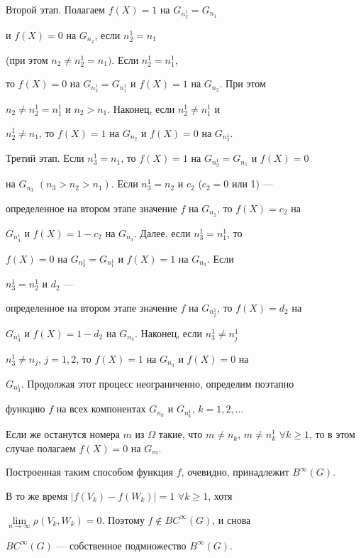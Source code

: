 \begin{pf}
Второй этап. Полагаем $f(X)=1$ на $G_{n^1_2}=G_{n_1}$


и $f(X)=0$ на $G_{n_2}$, если $n_2^1=n_1$


(при этом $n_2\neq n_2^1=n_1)$. Если $n_2^1=n_1^1$,


то $f(X)=0$ на $G_{n^1_2}=G_{n^1_1}$ и $f(X)=1$ на $G_{n_2}$. При этом


$n_2\neq n_2^1=n_1^1$ и $n_2>n_1$. Наконец, если $n_2^1\neq n_1^1$ и


$n_2^1\neq n_1$, то $f(X)=1$ на $G_{n_2}$ и $f(X)=0$ на $G_{n^1_2}$.


Третий этап. Если $n_3^1=n_1$, то $f(X)=1$ на $G_{n^1_3}=G_{n_1}$ и $f(X)=0$


на $G_{n_3}$ $(n_3>n_2>n_1)$. Если $n_3^1=n_2$ и $c_2$ ($c_2=0$ или 1) ---


определенное на втором этапе значение $f$ на $G_{n_2}$, то $f(X)=c_2$ на


$G_{n^1_3}$ и $f(X)=1-c_2$ на $G_{n_3}$. Далее, если $n_3^1=n_1^1$, то


$f(X)=0$ на $G_{n^1_3}=G_{n^1_1}$ и $f(X)=1$ на $G_{n_3}$. Если


$n_3^1=n_2^1$ и $d_2$ ---


определенное на втором этапе значение $f$ на $G_{n^1_2}$, то $f(X)=d_2$ на


$G_{n^1_3}$ и $f(X)=1-d_2$ на $G_{n_3}$. Наконец, если $n_3^1\neq n_j^1$


$n_3^1\neq n_j$, $j=1,2$, то $f(X)=1$ на  $G_{n_3}$ и $f(X)=0$ на


$G_{n_3^1}$. Продолжая этот процесс неограниченно, определим поэтапно


функцию $f$ на всех компонентах $G_{n_k}$ и $G_{n_k^1}$, $k=1,2,\dotsc$


Если же останутся номера $m$ из $\Omega$ такие, что $m\neq n_k$, $m\neq


n_k^1$ $\forall k\geqslant 1$, то в этом случае полагаем $f(X)=0$ на $G_m$.





Построенная таким способом функция $f$, очевидно, принадлежит $B^{\infty}(G)$.


В то же время $|f(V_k)-f(W_k)|=1$ $\forall k\geqslant 1$, хотя


$\lim\limits_


{n\to \infty} \rho(V_k,W_k)=0$. Поэтому $f\notin BC^{\infty}(G)$, и снова


$BC^{\infty}(G)$ --- собственное подмножество $B^{\infty}(G)$.


\end{pf}








